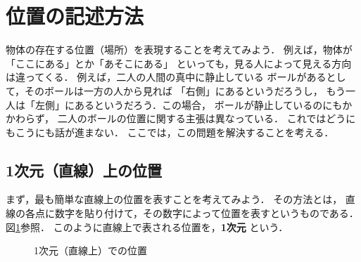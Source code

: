     \section{位置の記述方法}
        \begin{mycomment}
            物体の存在する位置（場所）を表現することを考えてみよう．
            例えば，物体が「ここにある」とか「あそこにある」
            といっても，見る人によって見える方向は違ってくる．
            例えば，二人の人間の真中に静止している
            ボールがあるとして，そのボールは一方の人から見れば
            「右側」にあるというだろうし，
            もう一人は「左側」にあるというだろう．この場合，
            ボールが静止しているのにもかかわらず，
            二人のボールの位置に関する主張は異なっている．
            これではどうにもこうにも話が進まない．
            ここでは，この問題を解決することを考える．
        \end{mycomment}


        \subsection{1次元（直線）上の位置}
                まず，最も簡単な直線上の位置を表すことを考えてみよう．
                その方法とは，
                直線の各点に数字を貼り付けて，その数字によって位置を表すというものである．
                図\ref{fig:ichi1}参照．
                このように直線上で表される位置を，\textbf{1次元} という．
                \begin{figure}[hbt]
                    \begin{center}
                        \caption{1次元（直線上）での位置}
                        \label{fig:ichi1}
                    \end{center}
                \end{figure}

